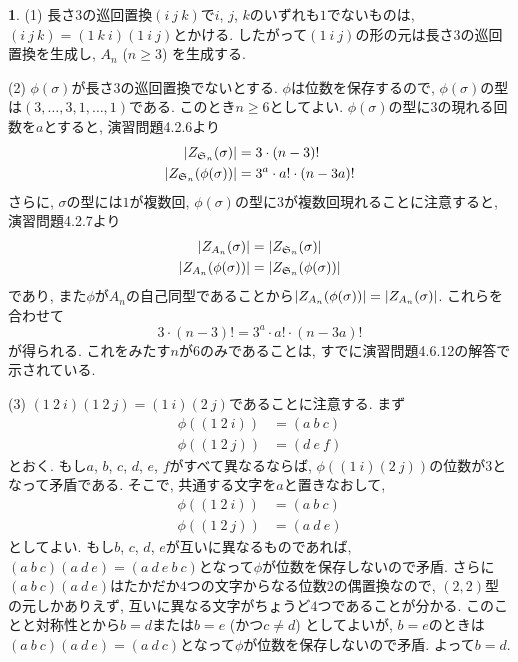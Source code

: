 \documentclass{article}
\theoremstyle{definition}
\newtheorem{ans}{}
\numberwithin{ans}{subsection}
\DeclarePairedDelimiter{\order}{\lvert}{\rvert}
\begin{document}
\begin{ans}
  (1) 長さ$3$の巡回置換$(i\ j\ k)$で$i$, $j$, $k$のいずれも$1$でないものは,
  $(i\ j\ k) = (1\ k\ i)(1\ i\ j)$とかける.
  したがって$(1\ i\ j)$の形の元は長さ$3$の巡回置換を生成し, $A_n$ ($n \ge 3$) を生成する.

  (2) $\phi(\sigma)$が長さ$3$の巡回置換でないとする.
  $\phi$は位数を保存するので, $\phi(\sigma)$の型は$(3,\dots, 3, 1,\dots, 1)$である.
  このとき$n \ge 6$としてよい.
  $\phi(\sigma)$の型に$3$の現れる回数を$a$とすると,
  演習問題4.2.6より
  \begin{align*}
    \order{Z_{\mathfrak{S}_n}(\sigma)} &= 3 \cdot (n - 3)! \\
    \order{Z_{\mathfrak{S}_n}(\phi(\sigma))} &= 3^a \cdot a! \cdot (n - 3a)!
  \end{align*}
  さらに, $\sigma$の型には$1$が複数回, $\phi(\sigma)$の型に$3$が複数回現れることに注意すると,
  演習問題4.2.7より
  \begin{align*}
    \order{Z_{A_n}(\sigma)} &= \order{Z_{\mathfrak{S}_n}(\sigma)}\\
    \order{Z_{A_n}(\phi(\sigma))} &= \order{Z_{\mathfrak{S}_n}(\phi(\sigma))}
  \end{align*}
  であり, また$\phi$が$A_n$の自己同型であることから$\order{Z_{A_n}(\phi(\sigma))} = \order{Z_{A_n}(\sigma)}$.
  これらを合わせて
  \[
    3 \cdot (n - 3)! = 3^a \cdot a! \cdot (n - 3a)!
  \]
  が得られる. これをみたす$n$が$6$のみであることは, すでに演習問題4.6.12の解答で示されている.

  (3) $(1\ 2\ i)(1\ 2\ j) = (1\ i)(2\ j)$であることに注意する.
  まず
  \begin{align*}
    \phi((1\ 2\ i)) &= (a\ b\ c) \\
    \phi((1\ 2\ j)) &= (d\ e\ f)
  \end{align*}
  とおく.
  もし$a$, $b$, $c$, $d$, $e$, $f$がすべて異なるならば,
  $\phi((1\ i)(2\ j))$の位数が$3$となって矛盾である.
  そこで, 共通する文字を$a$と置きなおして,
  \begin{align*}
    \phi((1\ 2\ i)) &= (a\ b\ c) \\
    \phi((1\ 2\ j)) &= (a\ d\ e)
  \end{align*}
  としてよい.
  もし$b$, $c$, $d$, $e$が互いに異なるものであれば,
  $(a\ b\ c)(a\ d\ e) = (a\ d\ e\ b\ c)$となって$\phi$が位数を保存しないので矛盾.
  さらに$(a\ b\ c)(a\ d\ e)$はたかだか$4$つの文字からなる位数$2$の偶置換なので,
  $(2, 2)$型の元しかありえず, 互いに異なる文字がちょうど$4$つであることが分かる.
  このことと対称性とから$b = d$または$b = e$ (かつ$c \neq d$) としてよいが, $b = e$のときは
  $(a\ b\ c)(a\ d\ e) = (a\ d\ c)$となって$\phi$が位数を保存しないので矛盾.
  よって$b = d$.


\end{ans}
\end{document}
